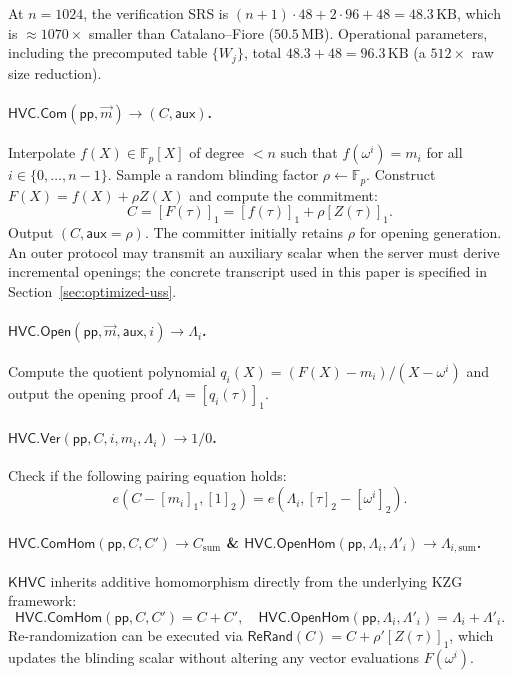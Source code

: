 At $n = 1024$, the verification SRS is $(n+1)\cdot 48 + 2\cdot 96 + 48 = 48.3\,\text{KB}$, which is $\approx 1070\times$ smaller than Catalano--Fiore ($50.5\,\text{MB}$). Operational parameters, including the precomputed table $\{W_j\}$, total $48.3 + 48 = 96.3\,\text{KB}$ (a $512\times$ raw size reduction).

\paragraph{$\mathsf{HVC.Com}(\mathsf{pp}, \vec{m}) \to (C, \mathsf{aux})$.}
Interpolate $f(X) \in \mathbb{F}_p[X]$ of degree $< n$ such that $f(\omega^i) = m_i$ for all $i \in \{0, \dots, n-1\}$. Sample a random blinding factor $\rho \leftarrow \mathbb{F}_p$. Construct $F(X) = f(X) + \rho Z(X)$ and compute the commitment:
\[
C = [F(\tau)]_1 = [f(\tau)]_1 + \rho [Z(\tau)]_1.
\]
Output $(C, \mathsf{aux} = \rho)$. The committer initially retains $\rho$ for opening generation. An outer protocol may transmit an auxiliary scalar when the server must derive incremental openings; the concrete transcript used in this paper is specified in Section~\ref{sec:optimized-uss}.

\paragraph{$\mathsf{HVC.Open}(\mathsf{pp}, \vec{m}, \mathsf{aux}, i) \to \Lambda_i$.}
Compute the quotient polynomial $q_i(X) = (F(X) - m_i) / (X - \omega^i)$ and output the opening proof $\Lambda_i = [q_i(\tau)]_1$.

\paragraph{$\mathsf{HVC.Ver}(\mathsf{pp}, C, i, m_i, \Lambda_i) \to 1 / 0$.}
Check if the following pairing equation holds:
\[
e\left(C - [m_i]_1, [1]_2\right) = e\left(\Lambda_i, [\tau]_2 - [\omega^i]_2\right).
\]

\paragraph{$\mathsf{HVC.ComHom}(\mathsf{pp}, C, C') \to C_{\mathrm{sum}}$ \& $\mathsf{HVC.OpenHom}(\mathsf{pp}, \Lambda_i, \Lambda'_i) \to \Lambda_{i, \mathrm{sum}}$.}
$\mathsf{KHVC}$ inherits additive homomorphism directly from the underlying KZG framework:
\[
\mathsf{HVC.ComHom}(\mathsf{pp}, C, C') = C + C', \quad \mathsf{HVC.OpenHom}(\mathsf{pp}, \Lambda_i, \Lambda'_i) = \Lambda_i + \Lambda'_i.
\]
Re-randomization can be executed via $\mathsf{ReRand}(C) = C + \rho' [Z(\tau)]_1$, which updates the blinding scalar without altering any vector evaluations $F(\omega^i)$.

